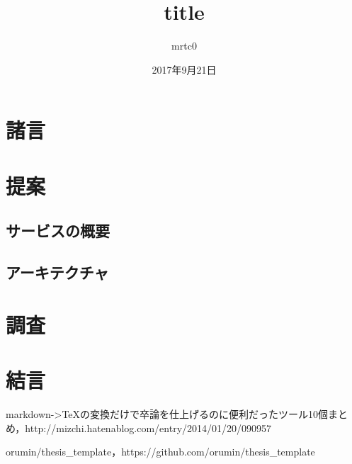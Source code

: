 \documentclass[shinchoku]{template} %
\title{title}
\author{mrtc0}
\date{2017年9月21日}
\begin{document}

\twocolumn[%
\maketitle
]

\section{諸言}



\section{提案}



\subsection{サービスの概要}


\subsection{アーキテクチャ}


\section{調査}


\section{結言}


\begin{thebibliography}{1}

markdown->TeXの変換だけで卒論を仕上げるのに便利だったツール10個まとめ，http://mizchi.hatenablog.com/entry/2014/01/20/090957

orumin/thesis\_template，https://github.com/orumin/thesis\_template

\end{thebibliography}
\end{document}

